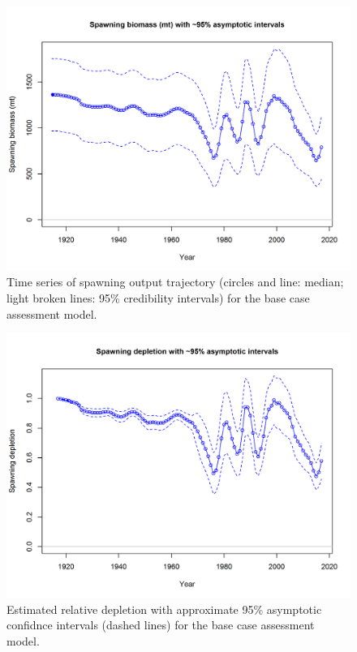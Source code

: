 \documentclass[12pt,]{article}
\begin{document}
\begin{figure}[htbp]
\centering
\includegraphics{r4ss/plots_mod1/ts7_Spawning_biomass_(mt)_with_95_asymptotic_intervals_intervals.png}
\caption{Time series of spawning output trajectory (circles and line:
median; light broken lines: 95\% credibility intervals) for the base
case assessment model. \label{fig:Spawnbio_all}}
\end{figure}

\begin{figure}[htbp]
\centering
\includegraphics{r4ss/plots_mod1/ts9_Spawning_depletion_with_95_asymptotic_intervals_intervals.png}
\caption{Estimated relative depletion with approximate 95\% asymptotic
confidnce intervals (dashed lines) for the base case assessment model.
\label{fig:RelDeplete_all}}
\end{figure}
\end{document}
